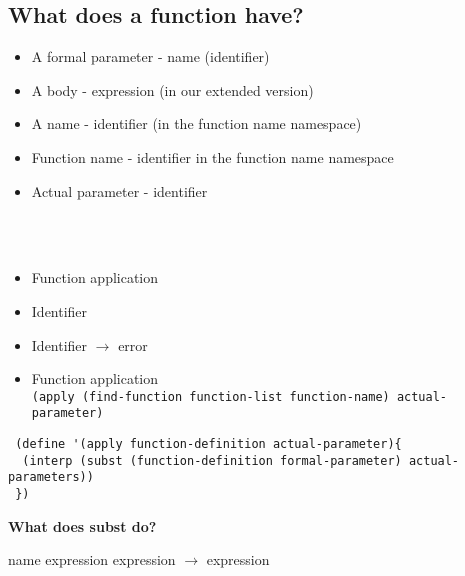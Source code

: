 \documentclass{article}
\newcommand\tab[1][1cm]{\hspace*{#1}}
\begin{document}
\begin{flushleft}
\subsection*{What does a function have?}
\begin{itemize}
 \item A formal parameter - name (identifier)
 \item A body - expression (in our extended version)
 \item A name - identifier (in the function name namespace)
 \item Function name - identifier in the function name namespace
 \item Actual parameter - identifier
\end{itemize}
\tab{Extend our expression data definition.}\\
\tab{We need to add two more variants.}\\
\begin{itemize}
 \item Function application
 \item Identifier
\end{itemize}
\tab{We need to extend the interpreter to deal with the two new variants in the data definition.}
\begin{itemize}
 \item Identifier $\rightarrow$ error
 \item Function application\\
 \verb|(apply (find-function function-list function-name) actual-parameter)|
\end{itemize}
\tab{Statement of purpose for apply, substitute the actual parameter for the formal parameter everywhere in the body of the function, then evaluate the result.}

\begin{verbatim}
 (define '(apply function-definition actual-parameter){
  (interp (subst (function-definition formal-parameter) actual-parameters))
 })
\end{verbatim}



\begin{flushleft}
\textbf{What does subst do?}\\
\end{flushleft}
name expression expression $\rightarrow$ expression


\end{flushleft}
\end{document}
